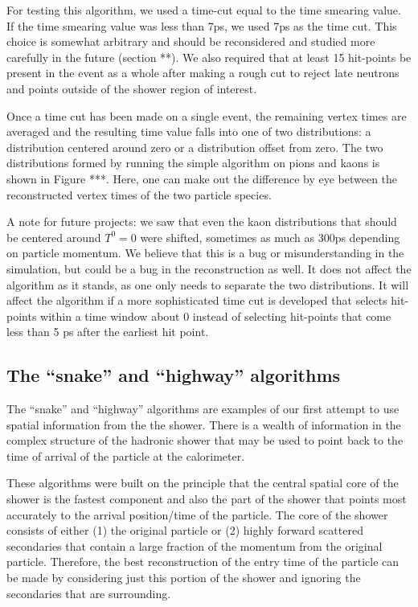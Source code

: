 \documentclass[12pt,twoside,letterpaper]{article}
\begin{document}
For testing this algorithm, we used a time-cut equal to the time smearing value. If the time smearing value was less than 7ps, we used 7ps as the time cut. This choice is somewhat arbitrary and should be reconsidered and studied more carefully in the future (section **). We also required that at least 15 hit-points be present in the event as a whole after making a rough cut to reject late neutrons and points outside of the shower region of interest.

Once a time cut has been made on a single event, the remaining vertex times are averaged and the resulting time value falls into one of two distributions: a distribution centered around zero or a distribution offset from zero. The two distributions formed by running the simple algorithm on pions and kaons is shown in Figure ***. Here, one can make out the difference by eye between the reconstructed vertex times of the two particle species. 


A note for future projects: we saw that even the kaon distributions that should be centered around $T^0 = 0$ were shifted, sometimes as much as 300ps depending on particle momentum. We believe that this is a bug or misunderstanding in the simulation, but could be a bug in the reconstruction as well. It does not affect the algorithm as it stands, as one only needs to separate the two distributions. It will affect the algorithm if a more sophisticated time cut is developed that selects hit-points within a time window about 0 instead of selecting hit-points that come less than 5 ps after the earliest hit point. 


\subsection{The ``snake'' and ``highway'' algorithms}

The ``snake'' and ``highway'' algorithms are examples of our first attempt to use spatial information from the the shower. There is a wealth of information in the complex structure of the hadronic shower that may be used to point back to the time of arrival of the particle at the calorimeter. 

These algorithms were built on the principle that the central spatial core of the shower is the fastest component and also the part of the shower that points most accurately to the arrival position/time of the particle. The core of the shower consists of either (1) the original particle or (2) highly forward scattered secondaries that contain a large fraction of the momentum from the original particle. Therefore, the best reconstruction of the entry time of the particle can be made by considering just this portion of the shower and ignoring the secondaries that are surrounding. 
\end{document}
